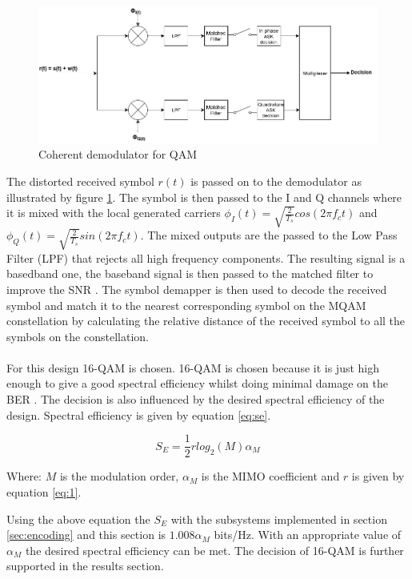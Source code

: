 \documentclass[11pt]{report}
\begin{document}
\begin{figure}[h!]
	\centering
	\includegraphics[width=\textwidth]{resources/demod.png}
	\caption{Coherent demodulator for QAM}
	\label{fig:demod}
\end{figure}
\vspace{12pt}
The distorted received symbol $r(t)$ is passed on to the demodulator as illustrated by figure \ref{fig:demod}. The symbol is then passed to the I and Q channels  where it is mixed with the local generated carriers $\phi_I(t) = \sqrt{\frac{2}{T_s}}cos(2\pi f_ct)$ and  $\phi_Q(t) = \sqrt{\frac{2}{T_s}}sin(2\pi f_ct)$. The mixed outputs are the passed to the Low Pass Filter (LPF) that rejects all high frequency components. The resulting signal is a basedband one, the baseband signal is then passed to the matched filter to improve the SNR \cite{B16}. The symbol demapper is then used to decode the received symbol and match it to the nearest corresponding symbol on the MQAM constellation by calculating the relative distance of the received symbol to all the symbols on the constellation. 
\\
\\
For this design 16-QAM is chosen. 16-QAM is chosen because it is just high enough to give a good spectral efficiency  whilst doing minimal damage on the BER \cite{B8}. The decision is also influenced by the desired spectral efficiency of the design. Spectral efficiency is given by equation \ref{eq:se}.

\begin{equation}
\label{eq:se}
S_E = \frac{1}{2}rlog_2(M)\alpha_M
\end{equation}
\begin{center}
	Where: $M$ is the modulation order, $\alpha_M$ is the MIMO coefficient and $r$ is given by equation \ref{eq:1}.
\end{center}

Using the above equation the $S_E$ with the subsystems implemented in section \ref{sec:encoding} and this section is $1.008\alpha_M$ bits/Hz. With an appropriate value of $\alpha_M$ the desired spectral efficiency can be met. The decision of 16-QAM is further supported in the results section.





\end{document}

